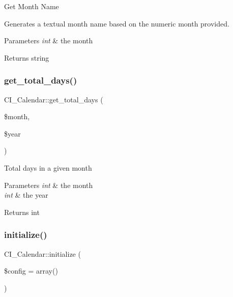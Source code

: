 Get Month Name

Generates a textual month name based on the numeric month provided.


\begin{DoxyParams}{Parameters}
{\em int} & the month \\
\hline
\end{DoxyParams}
\begin{DoxyReturn}{Returns}
string 
\end{DoxyReturn}
\mbox{\label{class_c_i___calendar_abcb093cef5b21da2b0e1bb63ef8d2ad0}} 
\subsubsection{\texorpdfstring{get\+\_\+total\+\_\+days()}{get\_total\_days()}}
{\footnotesize\ttfamily C\+I\+\_\+\+Calendar\+::get\+\_\+total\+\_\+days (\begin{DoxyParamCaption}\item[{}]{\$month,  }\item[{}]{\$year }\end{DoxyParamCaption})}

Total days in a given month


\begin{DoxyParams}{Parameters}
{\em int} & the month \\
\hline
{\em int} & the year \\
\hline
\end{DoxyParams}
\begin{DoxyReturn}{Returns}
int 
\end{DoxyReturn}
\mbox{\label{class_c_i___calendar_a8b91781c18d53697a832d46ecbfeee37}} 
\subsubsection{\texorpdfstring{initialize()}{initialize()}}
{\footnotesize\ttfamily C\+I\+\_\+\+Calendar\+::initialize (\begin{DoxyParamCaption}\item[{}]{\$config = {\ttfamily array()} }\end{DoxyParamCaption})}

